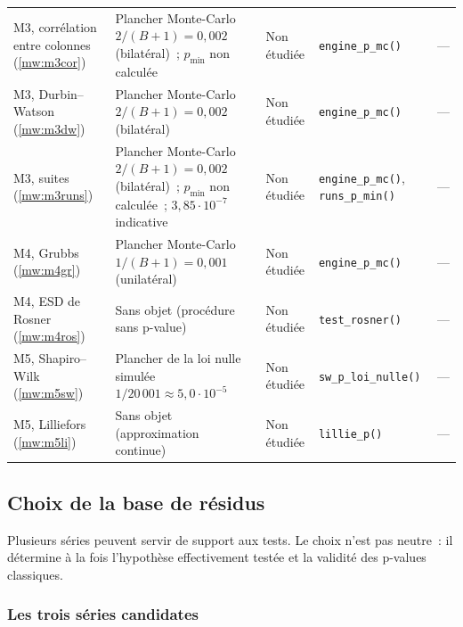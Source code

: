 \documentclass[a4paper,11pt]{article}
\newcommand{\code}[1]{\texttt{\small #1}}
\begin{document}
\begin{landscape}
\begin{center}
\begin{longtable}{@{}>{\raggedright\arraybackslash}p{2.5cm}>{\raggedright\arraybackslash}p{3.6cm}>{\raggedright\arraybackslash}p{4.0cm}>{\raggedright\arraybackslash}p{6.7cm}>{\raggedright\arraybackslash}p{7.2cm}@{}}
M3, corrélation entre colonnes (\ref{mw:m3cor}) & Plancher Monte-Carlo $2/(B+1) = 0{,}002$ (bilatéral)~; $p_{\min}$ non calculée & Non étudiée & \code{engine\_p\_mc()} & --- \\
M3, Durbin--Watson (\ref{mw:m3dw}) & Plancher Monte-Carlo $2/(B+1) = 0{,}002$ (bilatéral) & Non étudiée & \code{engine\_p\_mc()} & --- \\
M3, suites (\ref{mw:m3runs}) & Plancher Monte-Carlo $2/(B+1) = 0{,}002$ (bilatéral)~; $p_{\min}$ non calculée~; $3{,}85\cdot 10^{-7}$ indicative & Non étudiée & \code{engine\_p\_mc()}, \code{runs\_p\_min()} & --- \\
M4, Grubbs (\ref{mw:m4gr}) & Plancher Monte-Carlo $1/(B+1) = 0{,}001$ (unilatéral) & Non étudiée & \code{engine\_p\_mc()} & --- \\
M4, ESD de Rosner (\ref{mw:m4ros}) & Sans objet (procédure sans p-value) & Non étudiée & \code{test\_rosner()} & --- \\
M5, Shapiro--Wilk (\ref{mw:m5sw}) & Plancher de la loi nulle simulée $1/20\,001 \approx 5{,}0\cdot 10^{-5}$ & Non étudiée & \code{sw\_p\_loi\_nulle()} & --- \\
M5, Lilliefors (\ref{mw:m5li}) & Sans objet (approximation continue) & Non étudiée & \code{lillie\_p()} & --- \\
\end{longtable}
\end{center}
\end{landscape}

\subsection{Choix de la base de résidus}
\label{sec:base-residus}

Plusieurs séries peuvent servir de support aux tests. Le choix n'est pas neutre~:
il détermine à la fois l'hypothèse effectivement testée et la validité des
p-values classiques.

\subsubsection*{Les trois séries candidates}
\end{document}
